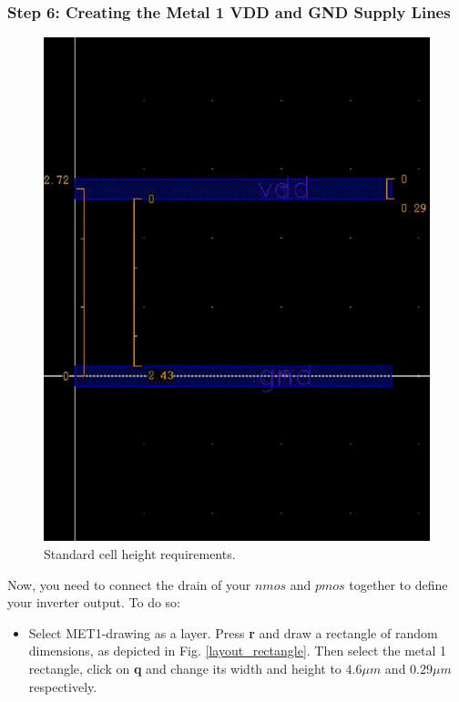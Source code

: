\subsubsection*{Step 6: Creating the Metal 1 VDD and GND Supply Lines}


\parbox[t]{\dimexpr\textwidth-\leftmargin}{%
	\begin{figure}
		\vspace{-6mm}
		\centering
		\vspace{-\baselineskip}
			\includegraphics[scale=0.33]{figures/lab2/5}
\caption{Standard cell height requirements.}
\label{spacing}
	\end{figure}
	Now, you need to connect the drain of your $nmos$ and $pmos$ together to define your inverter output. To do so:
		\begin{itemize}
	\item Select MET1-drawing as a layer. Press \textbf{r} and draw a rectangle of random dimensions, as depicted in Fig. \ref{layout_rectangle}. Then select the metal 1 rectangle, click on \textbf{q} and change its width and height to $4.6 \mu m$ and $0.29 \mu m$ respectively.

\end{itemize}}
